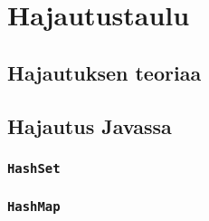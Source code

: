\chapter{Hajautustaulu}

\section{Hajautuksen teoriaa}

\section{Hajautus Javassa}

\subsection{\texttt{HashSet}}

\subsection{\texttt{HashMap}}
